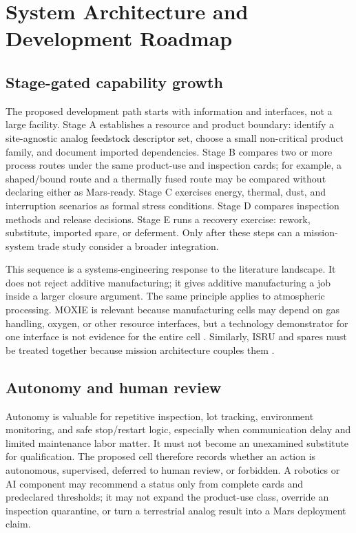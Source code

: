\documentclass[conference]{../../../../Conference-LaTeX-template_10-17-19/IEEEtran}
\begin{document}
\section{System Architecture and Development Roadmap}
\subsection{Stage-gated capability growth}
The proposed development path starts with information and interfaces, not a large facility. Stage A establishes a resource and product boundary: identify a site-agnostic analog feedstock descriptor set, choose a small non-critical product family, and document imported dependencies. Stage B compares two or more process routes under the same product-use and inspection cards; for example, a shaped/bound route and a thermally fused route may be compared without declaring either as Mars-ready. Stage C exercises energy, thermal, dust, and interruption scenarios as formal stress conditions. Stage D compares inspection methods and release decisions. Stage E runs a recovery exercise: rework, substitute, imported spare, or deferment. Only after these steps can a mission-system trade study consider a broader integration.

This sequence is a systems-engineering response to the literature landscape. It does not reject additive manufacturing; it gives additive manufacturing a job inside a larger closure argument. The same principle applies to atmospheric processing. MOXIE is relevant because manufacturing cells may depend on gas handling, oxygen, or other resource interfaces, but a technology demonstrator for one interface is not evidence for the entire cell \cite{hecht_etal_2020}. Similarly, ISRU and spares must be treated together because mission architecture couples them \cite{do_etal_2016}.

\subsection{Autonomy and human review}
Autonomy is valuable for repetitive inspection, lot tracking, environment monitoring, and safe stop/restart logic, especially when communication delay and limited maintenance labor matter. It must not become an unexamined substitute for qualification. The proposed cell therefore records whether an action is autonomous, supervised, deferred to human review, or forbidden. A robotics or AI component may recommend a status only from complete cards and predeclared thresholds; it may not expand the product-use class, override an inspection quarantine, or turn a terrestrial analog result into a Mars deployment claim.
\end{document}
